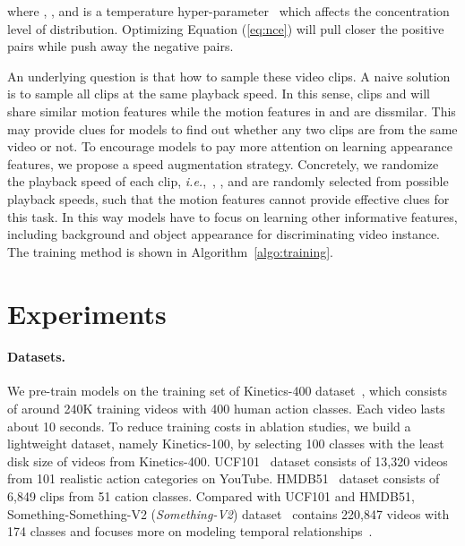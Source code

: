 \documentclass[final]{cvpr}
\def\ie{\mbox{\textit{i.e.}, }}
\begin{document}
where , , and  is a temperature hyper-parameter~\cite{wu2018unsupervised} which affects the concentration level of distribution. Optimizing Equation (\ref{eq:nce}) will pull closer the positive pairs while push away the negative pairs.

An underlying question is that how to sample these video clips. A naive solution is to sample all clips at the same playback speed. In this sense, clips  and  will share similar motion features while the motion features in  and  are dissmilar. This may provide clues for models to find out whether any two clips are from the same video or not. To encourage models to pay more attention on learning appearance features, we propose a speed augmentation strategy. Concretely, we randomize the playback speed of each clip, \ie , , and  are randomly selected from possible playback speeds, such that the motion features cannot provide effective clues for this task. 
In this way models have to focus on learning other informative features, including background and object appearance for discriminating video instance. 
The training method is shown in Algorithm~\ref{algo:training}.








	\section{Experiments}



\paragraph{Datasets.}
We pre-train models on the training set of Kinetics-400 dataset~\cite{carreira2017quo}, which consists of around 240K training videos with 400 human action classes. Each video lasts about 10 seconds. To reduce training costs in ablation studies, we build a lightweight dataset, namely Kinetics-100, by selecting 100 classes with the least disk size of videos from Kinetics-400.
UCF101~\cite{ucf101} dataset consists of 13,320 videos from 101 realistic action categories on YouTube. HMDB51~\cite{hmdb51} dataset consists of 6,849 clips from 51 cation classes.
Compared with UCF101 and HMDB51, Something-Something-V2 (\emph{Something-V2}) dataset~\cite{something} contains 220,847 videos with 174 classes and focuses more on modeling temporal relationships~\cite{LinGH19,ZhouAOT18}.
\end{document}
